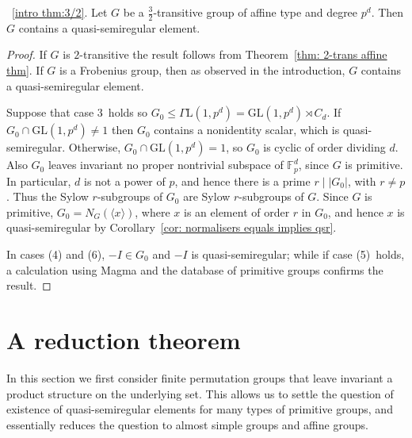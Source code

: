 \documentclass{article}
\theoremstyle{remark}
\theoremstyle{definition}
\newcommand{\GL}{\mathrm{GL}}
\newcommand{\qsr}{quasi-semiregular}
\newcommand{\qsre}{quasi-semiregular element}
\newcommand{\qsres}{quasi-semiregular elements}
\begin{document}
\smallskip

~\ref{intro thm:3/2}.     Let $G$ be a $\frac{3}{2}$-transitive group of  affine type and  degree $p^d$. Then $G$ contains a {\qsre}.
\smallskip
\begin{proof}
If $G$ is $2$-transitive the result follows from Theorem~\ref{thm: 2-trans affine thm}. If $G$ is a Frobenius group, then as observed in the introduction, $G$ contains a {\qsre}.

Suppose that case 3~holds so $G_0\leqslant \Gamma\mathrm{L}(1,p^d)=\GL(1,p^d)\rtimes C_d$. If $G_0 \cap \GL(1,p^d) \neq 1$ then $G_0$ contains a nonidentity scalar, which is {\qsr}. Otherwise, $G_0\cap \GL(1,p^d)=1$, so $G_0$ is cyclic of order dividing $d$. Also $G_0$ leaves invariant no proper nontrivial subspace of $\mathbb{F}_p^d$,  since $G$ is  primitive. In particular, $d$ is not a power of $p$, and hence there is a prime $r\mid |G_0|$, with $r\ne p$. Thus the Sylow $r$-subgroups of $G_0$ are Sylow $r$-subgroups of $G$. Since $G$ is primitive, $G_0=N_G(\langle x \rangle)$, where $x$ is an element of order $r$ in $G_0$, and hence $x$ is {\qsr} by Corollary~\ref{cor: normalisers equals implies qsr}.

In cases (4) and (6), $-I \in G_0$  and $-I$ is {\qsr}; while if case (5)~holds, a calculation using {\sc Magma} and the database of primitive groups \cite{Colva} confirms the result.
\end{proof}






\section{A reduction theorem}
\label{sec: reduction}

In this section we first consider finite permutation groups  that leave invariant a product structure on the underlying set. This allows us to settle the question of existence of {\qsres} for many types of primitive groups, and essentially reduces the question to almost simple groups and affine groups.

 
\end{document}

